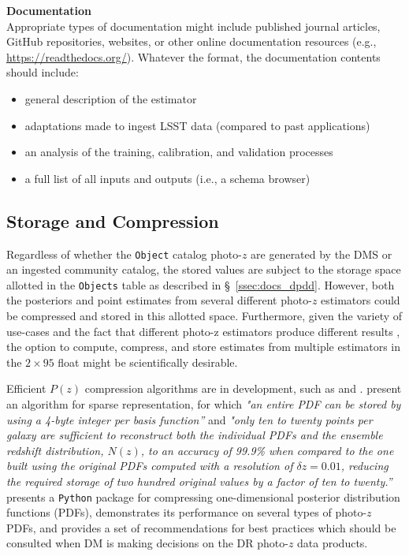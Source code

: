 \documentclass[DM,lsstdraft,toc]{lsstdoc}
\begin{document}
{\bf Documentation}\\
Appropriate types of documentation might include published journal articles, GitHub repositories, websites, or other online documentation resources (e.g., \url{https://readthedocs.org/}). Whatever the format, the documentation contents should include: 
\vspace{-15pt}
\begin{itemize}
\item general description of the estimator
\item adaptations made to ingest LSST data (compared to past applications)
\item an analysis of the training, calibration, and validation processes
\item a full list of all inputs and outputs (i.e., a schema browser)
\end{itemize}

\subsection{Storage and Compression}\label{ssec:dp_store}

Regardless of whether the {\tt Object} catalog photo-$z$ are generated by the DMS or an ingested community catalog, the stored values are subject to the storage space allotted in the {\tt Objects} table as described in \S~\ref{ssec:docs_dpdd}.
However, both the posteriors and point estimates from several different photo-$z$ estimators could be compressed and stored in this allotted space.
Furthermore, given the variety of use-cases and the fact that different photo-z estimators produce different results \citep{2020arXiv200103621S}, the option to compute, compress, and store estimates from multiple estimators in the $2\times95$ float might be scientifically desirable.

Efficient $P(z)$ compression algorithms are in development, such as \citet{2014MNRAS.441.3550C} and \citet{2018AJ....156...35M}.
\citet{2014MNRAS.441.3550C} present an algorithm for sparse representation, for which {\it "an entire PDF can be stored by using a 4-byte integer per basis function''} and {\it "only ten to twenty points per galaxy are sufficient to reconstruct both the individual PDFs and the ensemble redshift distribution, $N(z)$, to an accuracy of 99.9\% when compared to the one built using the original PDFs computed with a resolution of $\delta z = 0.01$, reducing the required storage of two hundred original values by a factor of ten to twenty.''} 
\citet{2018AJ....156...35M} presents a {\tt Python} package for compressing one-dimensional posterior distribution functions (PDFs), demonstrates its performance on several types of photo-$z$ PDFs, and provides a set of recommendations for best practices which should be consulted when DM is making decisions on the DR photo-$z$ data products.
\end{document}
